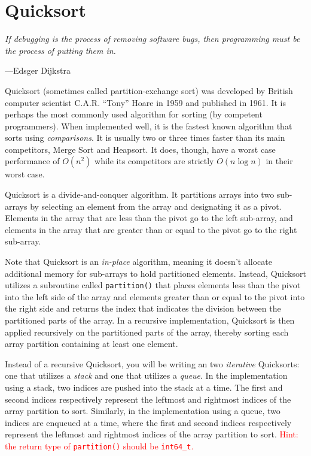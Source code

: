 \documentclass[11pt]{article}
\begin{document}
\section{Quicksort}

\epigraph{\emph{If debugging is the process of removing software bugs,
then programming must be the process of putting them in.}}{---Edsger
Dijkstra}

\noindent
Quicksort (sometimes called partition-exchange sort) was developed by
British computer scientist C.A.R. ``Tony'' Hoare in 1959 and published
in 1961. It is perhaps the most commonly used algorithm for sorting (by
competent programmers).  When implemented well, it is the fastest known
algorithm that sorts using \emph{comparisons}. It is usually two or
three times faster than its main competitors, Merge Sort and Heapsort.
It does, though, have a worst case performance of $O(n^2)$ while its
competitors are strictly $O(n \log n)$ in their worst case.

Quicksort is a divide-and-conquer algorithm. It partitions
arrays into two sub-arrays by selecting an element from the array and
designating it as a pivot. Elements in the array that are less than the
pivot go to the left sub-array, and elements in the array that are
greater than or equal to the pivot go to the right sub-array.

Note that Quicksort is an \emph{in-place} algorithm, meaning it doesn't
allocate additional memory for sub-arrays to hold partitioned elements.
Instead, Quicksort utilizes a subroutine called \texttt{partition()}
that places elements less than the pivot into the left side of the array
and elements greater than or equal to the pivot into the right side and
returns the index that indicates the division between the partitioned
parts of the array. In a recursive implementation, Quicksort is then
applied recursively on the partitioned parts of the array, thereby
sorting each array partition containing at least one element.

Instead of a recursive Quicksort, you will be writing an
two \emph{iterative} Quicksorts: one that utilizes a \emph{stack} and
one that utilizes a \emph{queue}. In the implementation using a stack,
two indices are pushed into the stack at a time. The first and second
indices respectively represent the leftmost and rightmost indices of the
array partition to sort.  Similarly, in the implementation using a
queue, two indices are enqueued at a time, where the first and second
indices respectively represent the leftmost and rightmost indices of the
array partition to sort. \textcolor{red}{Hint: the return type of
\texttt{partition()} should be \texttt{int64\_t}.}
\end{document}
